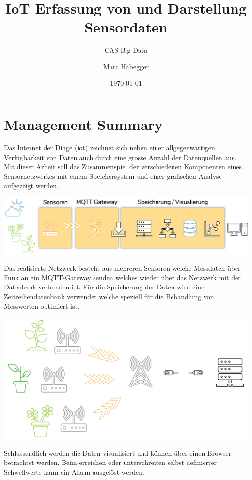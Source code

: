 \documentclass[
  12pt, %
  a4paper, %
  twoside, %
  openany, %
  numbers=noenddot, %
  BCOR=5mm, %
  parskip=half*, %
  thesis, %
]{bfhbook}
\author{Marc Habegger}
\title{IoT Erfassung von und Darstellung Sensordaten}
\subtitle{CAS Big Data}
\date{\today} %
\begin{document}
\maketitle
\frontmatter %

\tableofcontents
\sloppy
\mainmatter %
\chapter*{Management Summary}
Das Internet der Dinge (\Gls{iot}) zeichnet sich neben einer allgegenwärtigen Verfügbarkeit von Daten auch durch eine grosse Anzahl der Datenquellen aus. Mit dieser Arbeit soll das Zusammenspiel der verschiedenen Komponenten eines Sensornetzwerkes mit einem Speichersystem und einer grafischen Analyse aufgezeigt werden.

  \begin{center}
    \includegraphics[width=18cm, left]{Bilder/Overview.png}
     \captionsetup{justification=centering}
  \end{center}
   
Das realisierte Netzwerk besteht aus mehreren Sensoren welche Messdaten über Funk an ein MQTT-Gateway senden welches wieder über das Netzwerk mit der Datenbank verbunden ist. Für die Speicherung der Daten wird eine Zeitreihendatenbank verwendet welche speziell für die Behandlung von Messwerten optimiert ist.

  \begin{center}
    \includegraphics[width=14cm, left]{Bilder/Overview-2.png}
     \captionsetup{justification=centering}
  \end{center}
  Schlussendlich werden die Daten visualisiert und können über einen Browser betrachtet werden. Beim erreichen oder unterschreiten selbst definierter Schwellwerte kann ein Alarm ausgelöst werden.
\end{document}
